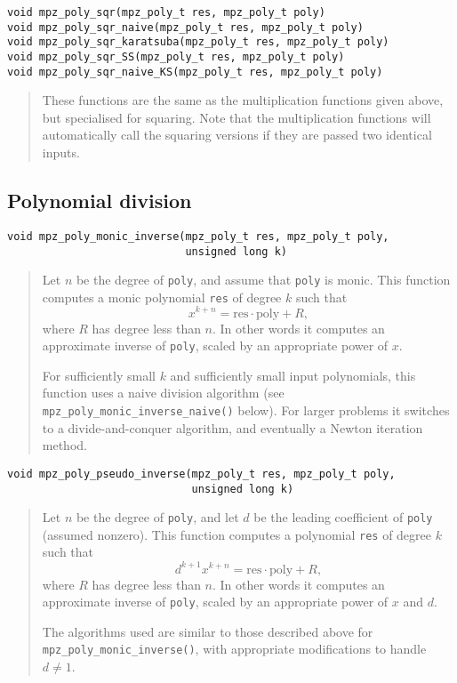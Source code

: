 \documentclass[a4paper,10pt]{article}
\newcommand{\code}{\lstinline}
\begin{document}
\begin{lstlisting}
void mpz_poly_sqr(mpz_poly_t res, mpz_poly_t poly)
void mpz_poly_sqr_naive(mpz_poly_t res, mpz_poly_t poly)
void mpz_poly_sqr_karatsuba(mpz_poly_t res, mpz_poly_t poly)
void mpz_poly_sqr_SS(mpz_poly_t res, mpz_poly_t poly)
void mpz_poly_sqr_naive_KS(mpz_poly_t res, mpz_poly_t poly)
\end{lstlisting}
\begin{quote}
These functions are the same as the multiplication functions given above, but specialised for squaring. Note that the multiplication functions will automatically call the squaring versions if they are passed two identical inputs.
\end{quote}



\subsection{Polynomial division}

\begin{lstlisting}
void mpz_poly_monic_inverse(mpz_poly_t res, mpz_poly_t poly,
                            unsigned long k)
\end{lstlisting}
\begin{quote}
Let $n$ be the degree of \code{poly}, and assume that \code{poly} is monic. This function computes a monic polynomial \code{res} of degree $k$ such that
 \[ x^{k+n} = \text{res} \cdot \text{poly} + R, \]
where $R$ has degree less than $n$. In other words it computes an approximate inverse of \code{poly}, scaled by an appropriate power of $x$.

For sufficiently small $k$ and sufficiently small input polynomials, this function uses a naive division algorithm (see \code{mpz_poly_monic_inverse_naive()} below). For larger problems it switches to a divide-and-conquer algorithm, and eventually a Newton iteration method.
\end{quote}


\begin{lstlisting}
void mpz_poly_pseudo_inverse(mpz_poly_t res, mpz_poly_t poly,
                             unsigned long k)
\end{lstlisting}
\begin{quote}
Let $n$ be the degree of \code{poly}, and let $d$ be the leading coefficient of \code{poly} (assumed nonzero). This function computes a polynomial \code{res} of degree $k$ such that
 \[ d^{k+1} x^{k+n} = \text{res} \cdot \text{poly} + R, \]
where $R$ has degree less than $n$. In other words it computes an approximate inverse of \code{poly}, scaled by an appropriate power of $x$ and $d$.

The algorithms used are similar to those described above for \code{mpz_poly_monic_inverse()}, with appropriate modifications to handle $d \neq 1$.
\end{quote}
\end{document}
